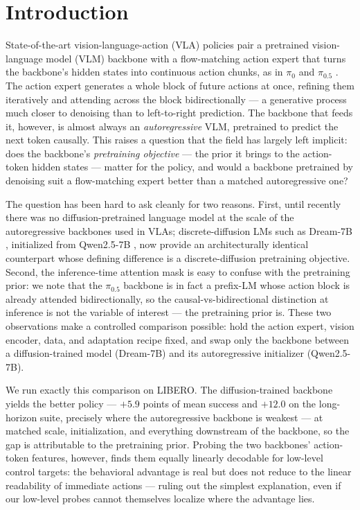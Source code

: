 \documentclass{article}
\begin{document}
\section{Introduction}
State-of-the-art vision-language-action (VLA) policies pair a pretrained
vision-language model (VLM) backbone with a flow-matching action expert that turns
the backbone's hidden states into continuous action chunks, as in $\pi_0$ and
$\pi_{0.5}$ \cite{pi0,pi05,openpi}. The action expert generates a whole block of
future actions at once, refining them iteratively and attending across the block
bidirectionally --- a generative process much closer to denoising than to
left-to-right prediction. The backbone that feeds it, however, is almost always an
\emph{autoregressive} VLM, pretrained to predict the next token causally. This
raises a question that the field has largely left implicit: does the backbone's
\emph{pretraining objective} --- the prior it brings to the action-token hidden
states --- matter for the policy, and would a backbone pretrained by denoising
suit a flow-matching expert better than a matched autoregressive one?

The question has been hard to ask cleanly for two reasons. First, until recently
there was no diffusion-pretrained language model at the scale of the autoregressive
backbones used in VLAs; discrete-diffusion LMs such as Dream-7B
\cite{dream}, initialized from Qwen2.5-7B \cite{qwen25}, now provide an
architecturally identical counterpart whose defining difference is a
discrete-diffusion pretraining objective. Second, the inference-time attention mask is easy to confuse with the
pretraining prior: we note that the $\pi_{0.5}$ backbone is in fact a prefix-LM
whose action block is already attended bidirectionally, so the causal-vs-bidirectional
distinction at inference is not the variable of interest --- the pretraining prior
is. These two observations make a controlled comparison possible: hold the action
expert, vision encoder, data, and adaptation recipe fixed, and swap only the
backbone between a diffusion-trained model (Dream-7B) and its autoregressive
initializer (Qwen2.5-7B).

We run exactly this comparison on LIBERO. The diffusion-trained backbone yields
the better policy --- $+5.9$ points of mean success and $+12.0$ on the
long-horizon suite, precisely where the autoregressive backbone is weakest --- at
matched scale, initialization, and everything downstream of the backbone, so the
gap is attributable to the pretraining prior. Probing the two backbones'
action-token features, however, finds them equally linearly decodable for
low-level control targets: the behavioral advantage is real but does not reduce to
the linear readability of immediate actions --- ruling out the simplest
explanation, even if our low-level probes cannot themselves localize where the
advantage lies.
\end{document}
